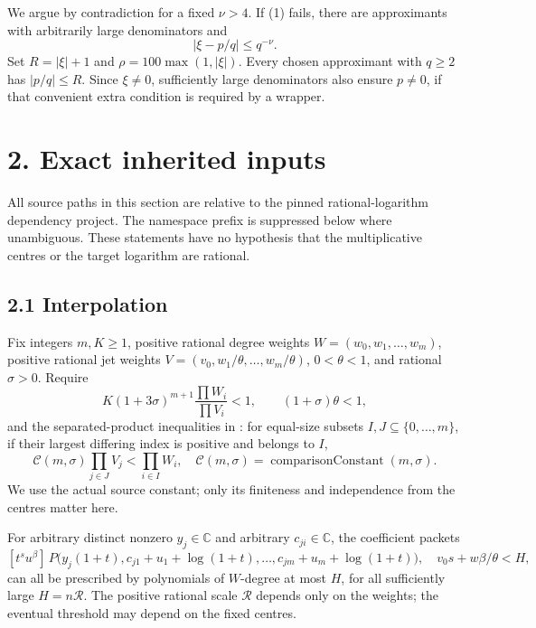 \documentclass[11pt]{article}
\begin{document}
We argue by contradiction for a fixed \(\nu>4\). If (1) fails, there are
approximants with arbitrarily large denominators and \[
|\xi-p/q|\le q^{-\nu}.                              \tag{3}
\] Set \(R=|\xi|+1\) and \(\rho=100\max(1,|\xi|)\). Every chosen
approximant with \(q\ge2\) has \(|p/q|\le R\). Since \(\xi\ne0\),
sufficiently large denominators also ensure \(p\ne0\), if that
convenient extra condition is required by a wrapper.

\section{2. Exact inherited inputs}\label{exact-inherited-inputs}

All source paths in this section are relative to the pinned
rational-logarithm dependency project. The namespace prefix 
is suppressed below where unambiguous. These statements have no
hypothesis that the multiplicative centres or the target logarithm are
rational.

\subsection{2.1 Interpolation}\label{interpolation}

Fix integers \(m,K\ge1\), positive rational degree weights
\(W=(w_0,w_1,\ldots,w_m)\), positive rational jet weights
\(V=(v_0,w_1/\theta,\ldots,w_m/\theta)\), \(0<\theta<1\), and rational
\(\sigma>0\). Require \[
K(1+3\sigma)^{m+1}\frac{\prod W_i}{\prod V_i}<1,
\qquad (1+\sigma)\theta<1,                           \tag{4}
\] and the separated-product inequalities in
: for
equal-size subsets \(I,J\subseteq\{0,\ldots,m\}\), if their largest
differing index is positive and belongs to \(I\), \[
\mathcal C(m,\sigma)\prod_{j\in J}V_j<\prod_{i\in I}W_i,
\quad
\mathcal C(m,\sigma)=
\operatorname{comparisonConstant}(m,\sigma).
                                                               \tag{5}
\] We use the actual source constant; only its finiteness and
independence from the centres matter here.

For arbitrary distinct nonzero \(y_j\in\mathbb C\) and arbitrary
\(c_{ji}\in\mathbb C\), the coefficient packets \[
[t^su^\beta]\,P\bigl(y_j(1+t),c_{j1}+u_1+\log(1+t),\ldots,
c_{jm}+u_m+\log(1+t)\bigr),\quad v_0s+w\beta/\theta<H,
\] can all be prescribed by polynomials of \(W\)-degree at most \(H\),
for all sufficiently large \(H=n\mathcal R\). The positive rational
scale \(\mathcal R\) depends only on the weights; the eventual threshold
may depend on the fixed centres.
\end{document}
